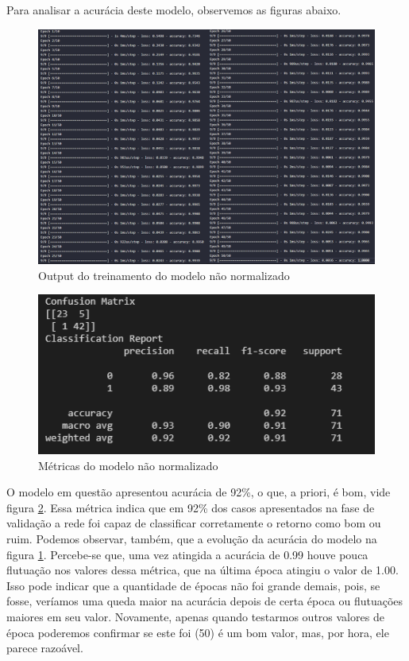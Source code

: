 \documentclass[12pt]{article}
\begin{document}
Para analisar a acurácia deste modelo, observemos as figuras abaixo.

\begin{figure}[H]
	\centering
	\includegraphics[width=1.1\linewidth]{Imagens/Fit_NaoNormalizado}
	\caption{Output do treinamento do modelo não normalizado}
	\label{fig:fitnaonormalizado}
\end{figure}

\begin{figure}[H]
	\centering
	\includegraphics[width=0.7\linewidth]{Imagens/resultadoNaoNormalizado}
	\caption{Métricas do modelo não normalizado}
	\label{fig:resultadonaonormalizado}
\end{figure}

O modelo em questão apresentou acurácia de 92\%, o que, a priori, é bom, vide figura \ref{fig:resultadonaonormalizado}. Essa métrica indica que em 92\% dos casos apresentados na fase de validação a rede foi capaz de classificar corretamente o retorno como bom ou ruim. Podemos observar, também, que a evolução da acurácia do modelo na figura \ref{fig:fitnaonormalizado}. Percebe-se que, uma vez atingida a acurácia de 0.99 houve pouca flutuação nos valores dessa métrica, que na última época atingiu o valor de 1.00. Isso pode indicar que a quantidade de épocas não foi grande demais, pois, se fosse, veríamos uma queda maior na acurácia depois de certa época ou flutuações maiores em seu valor. Novamente, apenas quando testarmos outros valores de época poderemos confirmar se este foi (50) é um bom valor, mas, por hora, ele parece razoável. 
\end{document}
